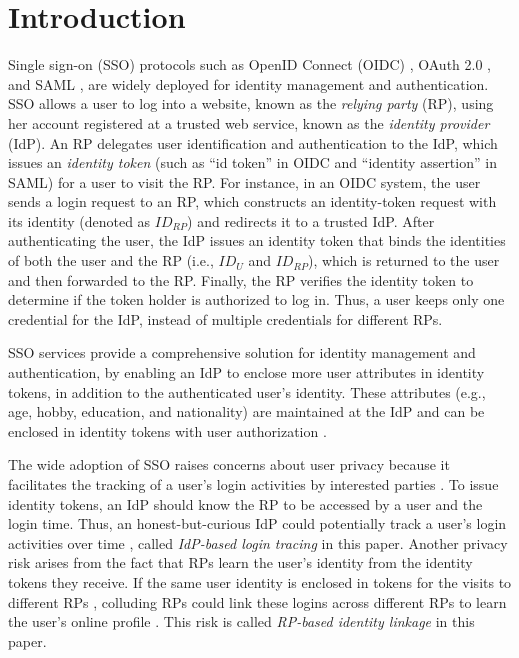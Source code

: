 \section{Introduction}
\label{sec:intro}
Single sign-on (SSO) protocols such as OpenID Connect (OIDC) \cite{OpenIDConnect}, OAuth 2.0 \cite{rfc6749}, and SAML \cite{SAML, SAMLIdentifier}, are widely deployed for identity management and authentication.
SSO allows a user to log into a website,
 known as the \emph{relying party} (RP), using her account registered at a trusted web service, known as the \emph{identity provider} (IdP).
An RP delegates user identification and authentication to the IdP, which issues an \emph{identity token} (such as ``id token'' in OIDC and ``identity assertion'' in SAML) for a user to visit the RP.
For instance, in an OIDC system, the user sends a login request to an RP,
which constructs an identity-token request with its identity (denoted as $ID_{RP}$) and redirects it to a trusted IdP. After authenticating the user, the IdP issues an identity token that binds the identities of both the user and the RP (i.e., $ID_U$ and $ID_{RP}$), which is returned to the user and then forwarded to the RP.
Finally, the RP verifies the identity token to determine if the token holder is authorized to log in. Thus, a user keeps only one credential for the IdP, instead of multiple credentials for different RPs.

SSO services provide a comprehensive solution for identity management and authentication,
 by enabling an IdP to enclose more user attributes in identity tokens, in addition to the authenticated user's identity.
These attributes (e.g., age, hobby, education, and nationality) are maintained at the IdP and can be enclosed in identity tokens with user authorization \cite{OpenIDConnect,rfc6749}.

The wide adoption of SSO raises concerns about user privacy because it facilitates the tracking of a user's login activities by interested parties \cite{NIST2017draft, SPRESSO, BrowserID, maler2008venn}.
To issue identity tokens, an IdP should know the RP to be accessed by a user and the login time.
Thus, an honest-but-curious IdP could potentially track a user's login activities over time \cite{BrowserID, SPRESSO},
called {\em IdP-based login tracing} in this paper.
Another privacy risk arises from the fact that RPs learn the user's identity from the identity tokens they receive.
If the same user identity is enclosed in tokens for the visits to different RPs \cite{maler2008venn, Google, FirefoxAccount}, colluding RPs could link these logins across different RPs %
to learn the user's online profile \cite{maler2008venn}.
This risk is called {\em RP-based identity linkage} in this paper.


